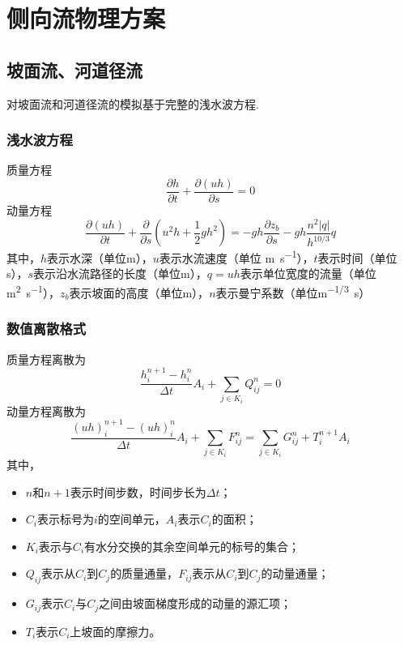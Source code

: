 \chapter{侧向流物理方案}

\section{坡面流、河道径流}
对坡面流和河道径流的模拟基于完整的浅水波方程.
 \subsection{浅水波方程}
 质量方程
  \begin{equation}
 \frac{\partial h}{\partial t} + \frac{\partial \left(uh\right)}{\partial s} = 0
 \end{equation}
 动量方程
 \begin{equation}
 \frac{\partial \left(uh\right)}{\partial t} + \frac{\partial}{\partial s}\left(u^2h+\frac{1}{2}gh^2\right) = -gh\frac{\partial z_b}{\partial s}-gh\frac{n^2\left|q\right|}{h^{10/3}}q
  \end{equation}
  其中，$h$表示水深（单位m），$u$表示水流速度（单位 \unit{m.s^{-1}}），$t$表示时间（单位s），$s$表示沿水流路径的长度（单位m），$q=uh$表示单位宽度的流量（单位\unit{m^2.s^{-1}}），$z_b$表示坡面的高度（单位m），$n$表示曼宁系数（单位\unit{m^{-1/3}.s}）


\subsection{数值离散格式}

 质量方程离散为
  \begin{equation}
 \frac{ h^{n+1}_i - h^n_i}{\Delta t} A_i+\sum_{j\in K_i} Q^n_{ij} = 0
 \end{equation}
 动量方程离散为
 \begin{equation}
 \frac{ \left(uh\right)^{n+1}_i - \left(uh\right)^n_i}{\Delta t} A_i + \sum_{j\in K_i} F^n_{ij} = \sum_{j\in K_i} G^n_{ij}  + T^{n+1}_i  A_i \label{swe-d-2}
  \end{equation}
其中，
\begin{itemize}
\item $n$和$n+1$表示时间步数，时间步长为$\Delta t$；
\item $C_i$表示标号为$i$的空间单元，$A_i$表示$C_i$的面积；
\item $K_i$表示与$C_i$有水分交换的其余空间单元的标号的集合；
\item $Q_{ij}$表示从$C_i$到$C_j$的质量通量，$F_{ij}$表示从$C_i$到$C_j$的动量通量；
\item $G_{ij}$表示$C_i$与$C_j$之间由坡面梯度形成的动量的源汇项；
\item $T_i$表示$C_i$上坡面的摩擦力。
\end{itemize}

